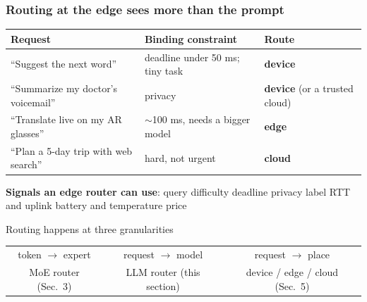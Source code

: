 \begin{frame}
\frametitle{Routing at the edge sees more than the prompt}
\vspace{4pt}
\centering
\small
\begin{tabular}{@{}lll@{}}
\toprule
Request & Binding constraint & Route \\
\midrule
``Suggest the next word'' & deadline under 50 ms; tiny task & \textcolor{devc}{\textbf{device}} \\
``Summarize my doctor's voicemail'' & privacy & \textcolor{devc}{\textbf{device}} (or a trusted cloud) \\
``Translate live on my AR glasses'' & $\sim$100 ms, needs a bigger model & \textcolor{edgec}{\textbf{edge}} \\
``Plan a 5-day trip with web search'' & hard, not urgent & \textcolor{cloudc}{\textbf{cloud}} \\
\bottomrule
\end{tabular}

\vspace{8pt}
\textbf{Signals an edge router can use}: query difficulty \textperiodcentered{} deadline \textperiodcentered{} privacy label \textperiodcentered{} RTT and uplink \textperiodcentered{} battery and temperature \textperiodcentered{} price
\normalsize
\vspace{8pt}
\begin{alertblock}{Routing happens at three granularities}
\centering
\begin{tabular}{ccc}
token $\rightarrow$ expert & request $\rightarrow$ model & request $\rightarrow$ place \\
\scriptsize MoE router (Sec.~3) & \scriptsize LLM router (this section) & \scriptsize device / edge / cloud (Sec.~5)
\end{tabular}
\end{alertblock}
\end{frame}


